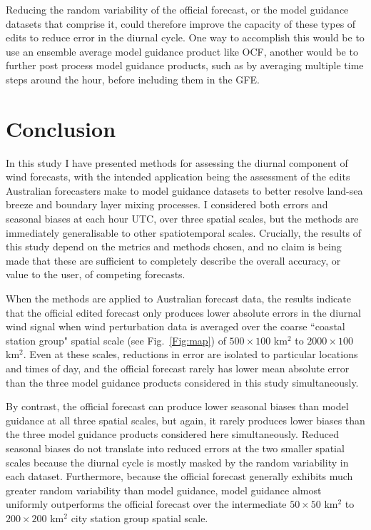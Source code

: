 \documentclass{ametsoc}
\begin{document}
Reducing the random variability of the official forecast, or the model guidance datasets that comprise it, could therefore improve the capacity of these types of edits to reduce error in the diurnal cycle. One way to accomplish this would be to use an ensemble average model guidance product like OCF, another would be to further post process model guidance products, such as by averaging multiple time steps around the hour, before including them in the GFE.

\section{Conclusion}
\label{Sec:Conclusion}
In this study I have presented methods for assessing the diurnal component of wind forecasts, with the intended application being the assessment of the edits Australian forecasters make to model guidance datasets to better resolve land-sea breeze and boundary layer mixing processes. I considered both errors and seasonal biases at each hour UTC, over three spatial scales, but the methods are immediately generalisable to other spatiotemporal scales. Crucially, the results of this study depend on the metrics and methods chosen, and no claim is being made that these are sufficient to completely describe the overall accuracy, or value to the user, of competing forecasts.

When the methods are applied to Australian forecast data, the results indicate that the official edited forecast only produces lower absolute errors in the diurnal wind signal when wind perturbation data is averaged over the coarse ``coastal station group" spatial scale (see Fig.~\ref{Fig:map}) of $500\times 100$ km$^{2}$ to $2000 \times 100$ km$^{2}$. Even at these scales, reductions in error are isolated to particular locations and times of day, and the official forecast rarely has lower mean absolute error than the three model guidance products considered in this study simultaneously.

By contrast, the official forecast can produce lower seasonal biases than model guidance at all three spatial scales, but again, it rarely produces lower biases than the three model guidance products considered here simultaneously. Reduced seasonal biases do not translate into reduced errors at the two smaller spatial scales because the diurnal cycle is mostly masked by the random variability in each dataset. Furthermore, because the official forecast generally exhibits much greater random variability than model guidance, model guidance almost uniformly outperforms the official forecast over the intermediate $50\times 50$ km$^{2}$ to $200 \times 200$ km$^{2}$ city station group spatial scale.
\end{document}
